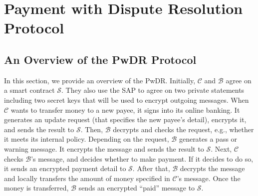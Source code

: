 






\vspace{-4mm}
\section{Payment with Dispute Resolution Protocol}\label{sec::PwDR-Protocol}


\vspace{-.5mm}

\subsection{An Overview of  the PwDR Protocol}
\vspace{-.5mm}

In this section, we provide an overview of the   PwDR. Initially,     $\mathcal{C}$ and   $\mathcal{B}$   agree on a smart contract  $\mathcal{S}$. They also use the SAP to  agree on two private statements  including two  secret keys that  will be used to encrypt outgoing messages. When $\mathcal{C}$ wants to transfer money to a new payee, it   signs into its online banking.  It generates an update  request (that specifies the new payee's detail),  encrypts it, and sends the result to  $\mathcal{S}$. Then, $\mathcal{B}$ decrypts and checks the request, e.g.,  whether it  meets its internal policy. Depending on the  request, $\mathcal{B}$ generates a pass or warning message. It encrypts the message and sends the result to $\mathcal{S}$. Next, $\mathcal{C}$ checks $\mathcal{B}$'s message, and  decides whether  to   make  payment. If it decides to do so,  it sends an encrypted payment detail to $\mathcal{S}$. After that, $\mathcal{B}$  decrypts the message and locally transfers the amount of money specified in $\mathcal{C}$'s message. Once the money is transferred, $\mathcal{B}$ sends an encrypted  ``paid'' message to $\mathcal{S}$. 


